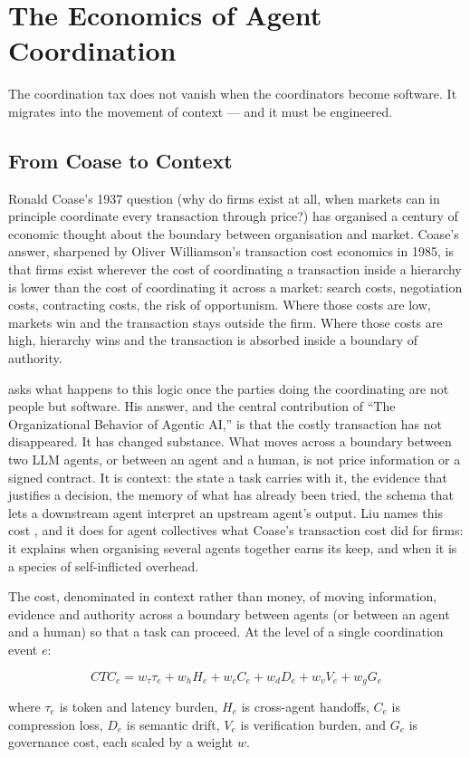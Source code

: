 \chapter{The Economics of Agent Coordination}
\label{ch:coordination-economics}

\epigraph{The coordination tax does not vanish when the coordinators become software. It migrates into the movement of context --- and it must be engineered.}{}

\section{From Coase to Context}

Ronald Coase's 1937 question (why do firms exist at all, when markets can in principle coordinate every transaction through price?) has organised a century of economic thought about the boundary between organisation and market. Coase's answer, sharpened by Oliver Williamson's transaction cost economics in 1985, is that firms exist wherever the cost of coordinating a transaction inside a hierarchy is lower than the cost of coordinating it across a market: search costs, negotiation costs, contracting costs, the risk of opportunism. Where those costs are low, markets win and the transaction stays outside the firm. Where those costs are high, hierarchy wins and the transaction is absorbed inside a boundary of authority.

\textcite{Liu2026} asks what happens to this logic once the parties doing the coordinating are not people but software. His answer, and the central contribution of ``The Organizational Behavior of Agentic AI,'' is that the costly transaction has not disappeared. It has changed substance. What moves across a boundary between two LLM agents, or between an agent and a human, is not price information or a signed contract. It is context: the state a task carries with it, the evidence that justifies a decision, the memory of what has already been tried, the schema that lets a downstream agent interpret an upstream agent's output. Liu names this cost , and it does for agent collectives what Coase's transaction cost did for firms: it explains when organising several agents together earns its keep, and when it is a species of self-inflicted overhead.

\begin{definitionbox}[title={Contextual Transaction Cost (CTC)}]
The cost, denominated in context rather than money, of moving information, evidence and authority across a boundary between agents (or between an agent and a human) so that a task can proceed. At the level of a single coordination event $e$:

\[
CTC_e = w_\tau \tau_e + w_h H_e + w_c C_e + w_d D_e + w_v V_e + w_g G_e
\]

where $\tau_e$ is token and latency burden, $H_e$ is cross-agent handoffs, $C_e$ is compression loss, $D_e$ is semantic drift, $V_e$ is verification burden, and $G_e$ is governance cost, each scaled by a weight $w$.
\end{definitionbox}


